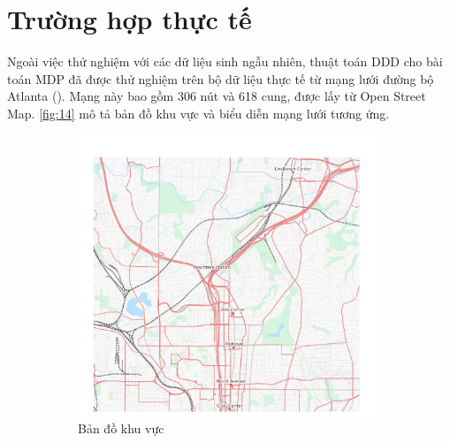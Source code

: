 \documentclass[../main.tex]{subfiles}
\begin{document}
\section{Trường hợp thực tế}\label{case-study}

Ngoài việc thử nghiệm với các dữ liệu sinh ngẫu nhiên, thuật toán DDD cho bài toán MDP đã được thử  
nghiệm trên bộ dữ liệu thực tế từ mạng lưới
đường bộ Atlanta (\cite{he2022dynamic}). Mạng này bao gồm 306 nút và 618 cung, được lấy từ Open
Street Map. \autoref{fig:14} mô tả bản đồ khu vực và biểu diễn mạng lưới tương
ứng.


\begin{figure}
    \centering
    \begin{subfigure}{0.45\textwidth}
        \centering
        \includegraphics{edited-images/Figure14a.jpg}
        \caption{Bản đồ khu vực}
        \label{fig:14a}
    \end{subfigure}
    \begin{subfigure}{0.45\textwidth}
        \centering

\end{subfigure}
\end{figure}
\end{document}
